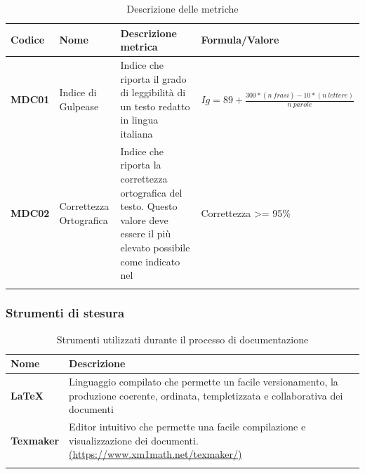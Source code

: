 {{{
	\setlength{\freewidth}{\dimexpr\textwidth-0\tabcolsep}
	\renewcommand{\arraystretch}{1.5}
	\setlength{\aboverulesep}{0pt}
	\setlength{\belowrulesep}{0pt}
	\begin{longtable}{L{.1\freewidth} L{.15\freewidth} L{.3\freewidth} L{.35\freewidth}}
		\textbf{Codice} & \textbf{Nome} & \textbf{Descrizione metrica} & \textbf{Formula/Valore}\\
		\toprule
		\endhead		
		\textbf{MDC01} & Indice di Gulpease & Indice che riporta il grado di leggibilità di un testo redatto in lingua italiana & \small{$Ig= 89 + \frac{300 * (n\ frasi) - 10 * (n\ lettere)}{n\ parole}$} \\
		\textbf{MDC02} & Correttezza Ortografica & Indice che riporta la correttezza ortografica del testo. Questo valore deve essere il più elevato possibile come indicato nel \PdQ{} & Correttezza >= 95\% \\
		
		\bottomrule
		\hiderowcolors
		\caption{Descrizione delle metriche}\\
	\end{longtable}
}


\subsubsection{Strumenti di stesura}

	\setlength{\freewidth}{\dimexpr\textwidth-1\tabcolsep}
	\renewcommand{\arraystretch}{1.5}
	\setlength{\aboverulesep}{0pt}
	\setlength{\belowrulesep}{0pt}
	\begin{longtable}{L{.210\freewidth} L{.75\freewidth} L{.080\freewidth}}
		\textbf{Nome} & \textbf{Descrizione} \\
		\toprule
		\endhead		
		\textbf{\LaTeX} & Linguaggio compilato che permette un facile versionamento, la produzione coerente, ordinata, templetizzata e collaborativa dei documenti \\
		\textbf{Texmaker} & Editor intuitivo che permette una facile compilazione e visualizzazione dei documenti. \newline \url{(https://www.xm1math.net/texmaker/)}\\
		\bottomrule
		\hiderowcolors
		\caption{Strumenti utilizzati durante il processo di documentazione}
	\end{longtable}

}}
